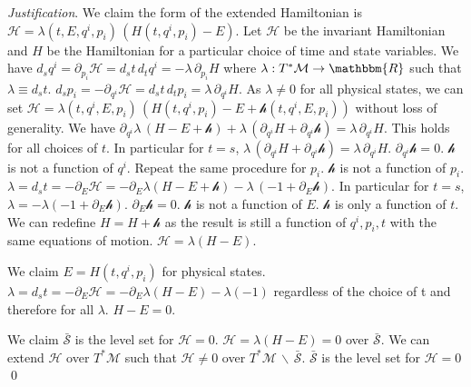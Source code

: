 \documentclass[aps,pra,10pt,twocolumn,floatfix,nofootinbib]{revtex4-1}
\numberwithin{equation}{section}
\theoremstyle{definition}
\newenvironment{justification}{\emph{Justification}.}{\qed}
\begin{document}
\begin{justification}
	We claim the form of the extended Hamiltonian is $\mathcal{H} = \lambda(t,E,q^i,p_i) \, (H(t,q^i,p_i) - E)$. Let $\mathcal{H}$ be the invariant Hamiltonian and $H$ be the Hamiltonian for a particular choice of time and state variables. We have $d_s q^i = \partial_{p_i} \mathcal{H} = d_s t \, d_t q^i = - \lambda \, \partial_{p_i} H$ where $\lambda : T^*\mathcal{M} \rightarrow \mathbbm{R}$ such that $\lambda \equiv d_s t$. $d_s p_i = - \partial_{q^i} \mathcal{H} = d_s t \, d_t p_i = \lambda \, \partial_{q^i} H$. As $\lambda \neq 0$ for all physical states, we can set $\mathcal{H} = \lambda(t,q^i,E,p_i) \, (H(t,q^i,p_i) - E + \mathcal{h}(t,q^i,E,p_i))$ without loss of generality. We have $\partial_{q^i} \lambda \, (H - E + \mathcal{h}) + \lambda \, (\partial_{q^i} H + \partial_{q^i} \mathcal{h}) = \lambda \, \partial_{q^i} H$. This holds for all choices of $t$. In particular for $t=s$, $\lambda \, (\partial_{q^i} H + \partial_{q^i} \mathcal{h}) = \lambda \, \partial_{q^i} H$. $\partial_{q^i} \mathcal{h} = 0$. $\mathcal{h}$ is not a function of $q^i$. Repeat the same procedure for $p_i$. $\mathcal{h}$ is not a function of $p_i$. $\lambda = d_s t = - \partial_E \mathcal{H} = - \partial_{E} \lambda (H - E + \mathcal{h}) - \lambda \, (-1 + \partial_{E} \mathcal{h})$. In particular for $t=s$, $\lambda = - \lambda (-1 + \partial_{E} \mathcal{h})$. $\partial_{E} \mathcal{h} = 0$. $\mathcal{h}$ is not a function of $E$. $\mathcal{h}$ is only a function of $t$. We can redefine $H = H + \mathcal{h}$ as the result is still a function of $q^i, p_i , t$ with the same equations of motion. $\mathcal{H}=\lambda (H - E)$.
	
	We claim $E = H(t,q^i,p_i)$ for physical states. $\lambda = d_s t = - \partial_E \mathcal{H} = - \partial_{E} \lambda (H - E) - \lambda (-1)$ regardless of the choice of t and therefore for all $\lambda$. $H - E = 0$. 
	
	We claim $\bar{\mathcal{S}}$ is the level set for $\mathcal{H} = 0$. $\mathcal{H} = \lambda (H - E) = 0$ over $\bar{\mathcal{S}}$. We can extend $\mathcal{H}$ over $T^* \mathcal{M}$ such that $\mathcal{H} \neq 0$ over $T^*\mathcal{M} \,\backslash\, \bar{\mathcal{S}}$. $\bar{\mathcal{S}}$ is the level set for $\mathcal{H} = 0$
\end{justification}
\end{document}
